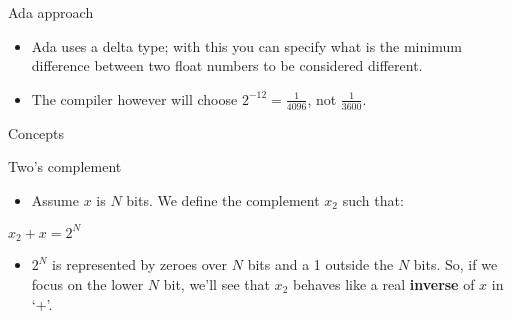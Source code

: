 \documentclass[ignorenonframetext,,aspectratio=169]{beamer}
\providecommand{\tightlist}{%
  \setlength{\itemsep}{0pt}\setlength{\parskip}{0pt}}
\begin{document}
\begin{frame}{Ada approach}

\begin{itemize}
\item
  Ada uses a delta type; with this you can specify what is the minimum
  difference between two float numbers to be considered different.
\item
  The compiler however will choose \(2^{-12} = \frac{1}{4096}\), not
  \(\frac{1}{3600}\).
\end{itemize}

\end{frame}

\begin{frame}{Concepts}

Two's complement

\begin{itemize}
\tightlist
\item
  Assume \(x\) is \(N\) bits. We define the complement \(x_2\) such
  that:
\end{itemize}

\(x_2 + x = 2^N\)

\begin{itemize}
\tightlist
\item
  \(2^N\) is represented by zeroes over \(N\) bits and a 1 outside the
  \(N\) bits. So, if we focus on the lower \(N\) bit, we'll see that
  \(x_2\) behaves like a real \textbf{inverse} of \(x\) in `+'.
\end{itemize}

\end{frame}
\end{document}
